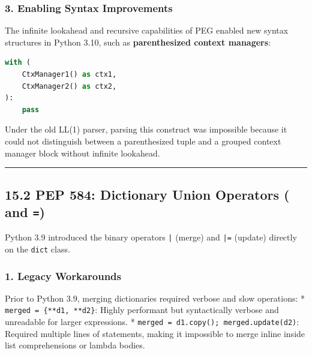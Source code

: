 \hypertarget{enabling-syntax-improvements}{%
\subsubsection{3. Enabling Syntax
Improvements}\label{enabling-syntax-improvements}}

The infinite lookahead and recursive capabilities of PEG enabled new
syntax structures in Python 3.10, such as \textbf{parenthesized context
managers}:

\begin{lstlisting}[language=Python]
with (
    CtxManager1() as ctx1,
    CtxManager2() as ctx2,
):
    pass
\end{lstlisting}

Under the old LL(1) parser, parsing this construct was impossible
because it could not distinguish between a parenthesized tuple and a
grouped context manager block without infinite lookahead.

\begin{center}\rule{0.5\linewidth}{0.5pt}\end{center}

\hypertarget{pep-584-dictionary-union-operators-and}{%
\subsection{\texorpdfstring{15.2 PEP 584: Dictionary Union Operators
(\texttt{\textbar{}} and
\texttt{\textbar{}=})}{15.2 PEP 584: Dictionary Union Operators (\textbar{} and \textbar=)}}\label{pep-584-dictionary-union-operators-and}}

Python 3.9 introduced the binary operators \passthrough{\lstinline!|!}
(merge) and \passthrough{\lstinline!|=!} (update) directly on the
\passthrough{\lstinline!dict!} class.

\hypertarget{legacy-workarounds}{%
\subsubsection{1. Legacy Workarounds}\label{legacy-workarounds}}

Prior to Python 3.9, merging dictionaries required verbose and slow
operations: * \passthrough{\lstinline!merged = \{**d1, **d2\}!}: Highly
performant but syntactically verbose and unreadable for larger
expressions. *
\passthrough{\lstinline!merged = d1.copy(); merged.update(d2)!}:
Required multiple lines of statements, making it impossible to merge
inline inside list comprehensions or lambda bodies.

